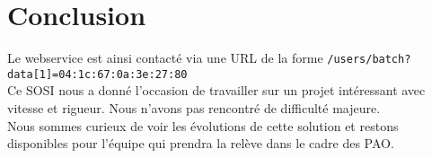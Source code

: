 \chapter*{Conclusion}

Le webservice est ainsi contacté via une URL de la forme \verb|/users/batch?data[1]=04:1c:67:0a:3e:27:80|
\\
Ce SOSI nous a donné l'occasion de travailler sur un projet intéressant avec vitesse et rigueur. Nous n'avons pas rencontré de difficulté majeure.
\\
Nous sommes curieux de voir les évolutions de cette solution et restons disponibles pour l'équipe qui prendra la relève dans le cadre des PAO.
